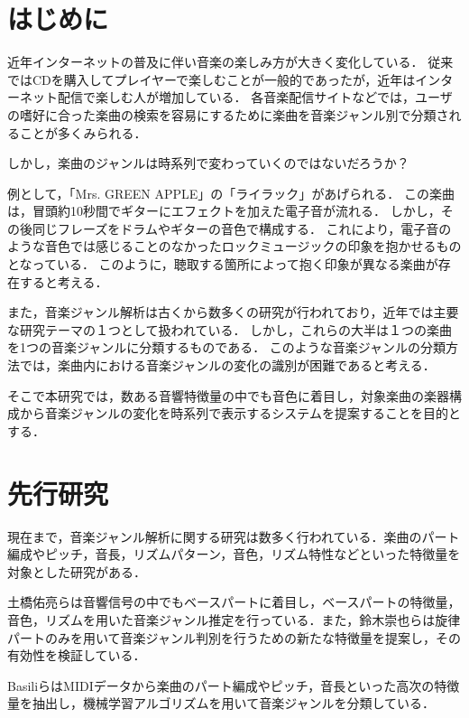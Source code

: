 

\section{はじめに}

近年インターネットの普及に伴い音楽の楽しみ方が大きく変化している．
従来ではCDを購入してプレイヤーで楽しむことが一般的であったが，近年はインターネット配信で楽しむ人が増加している．
各音楽配信サイトなどでは，ユーザの嗜好に合った楽曲の検索を容易にするために楽曲を音楽ジャンル別で分類されることが多くみられる．

しかし，楽曲のジャンルは時系列で変わっていくのではないだろうか？

例として，「Mrs. GREEN APPLE」の「ライラック」\cite{fingofam}があげられる．
この楽曲は，冒頭約10秒間でギターにエフェクトを加えた電子音が流れる．
しかし，その後同じフレーズをドラムやギターの音色で構成する．
これにより，電子音のような音色では感じることのなかったロックミュージックの印象を抱かせるものとなっている．
このように，聴取する箇所によって抱く印象が異なる楽曲が存在すると考える．

また，音楽ジャンル解析は古くから数多くの研究が行われており，近年では主要な研究テーマの１つとして扱われている．
しかし，これらの大半は１つの楽曲を1つの音楽ジャンルに分類するものである．
このような音楽ジャンルの分類方法では，楽曲内における音楽ジャンルの変化の識別が困難であると考える．

そこで本研究では，数ある音響特徴量の中でも音色に着目し，対象楽曲の楽器構成から音楽ジャンルの変化を時系列で表示するシステムを提案することを目的とする．




\section{先行研究}
現在まで，音楽ジャンル解析に関する研究は数多く行われている．楽曲のパート編成やピッチ，音長，リズムパターン，音色，リズム特性などといった特徴量を対象とした研究がある．

土橋佑亮ら\cite{bassline}は音響信号の中でもベースパートに着目し，ベースパートの特徴量，音色，リズムを用いた音楽ジャンル推定を行っている．また，鈴木崇也ら\cite{melody}は旋律パートのみを用いて音楽ジャンル判別を行うための新たな特徴量を提案し，その有効性を検証している．

Basiliら\cite{basili}はMIDIデータから楽曲のパート編成やピッチ，音長といった高次の特徴量を抽出し，機械学習アルゴリズムを用いて音楽ジャンルを分類している．

